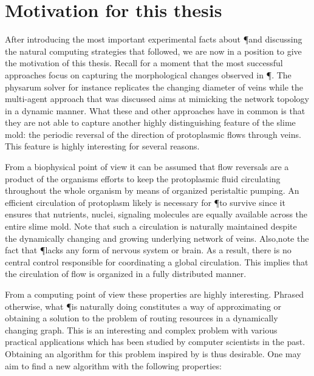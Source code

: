 \section{Motivation for this thesis}

	After introducing the most important experimental facts about \P and discussing the natural computing strategies that followed, we are now in a position to give the motivation of this thesis. Recall for a moment that the most successful approaches focus on capturing the morphological changes observed in \P. The physarum solver for instance replicates the changing  diameter of veins while the multi-agent approach that was discussed aims at mimicking the network topology in a dynamic manner. What these and other approaches have in common is that they are not able to capture another highly distinguishing feature of the slime mold: the periodic reversal of the direction of protoplasmic flows through veins. This feature is highly interesting for several reasons. 

	From a biophysical point of view it can be assumed that flow reversals are a product of the organisms efforts to keep the protoplasmic fluid circulating throughout the whole organism by means of organized peristaltic pumping. An efficient circulation of protoplasm likely is necessary for \P to survive since it ensures that nutrients, nuclei, signaling molecules \etc are equally available across the entire slime mold. Note that such a circulation is naturally maintained despite the dynamically changing and growing underlying network of veins. Also,note the fact that \P lacks any form of nervous system or brain. As a result, there is no central control responsible for coordinating a global circulation. This implies that the circulation of flow is organized in a fully distributed manner.

	From a computing point of view these properties are highly interesting. Phrased otherwise, what \P is naturally doing constitutes a way of approximating or obtaining a solution to the problem of routing resources in a dynamically changing graph. This is an interesting and complex problem with various practical applications which has been studied by computer scientists in the past. Obtaining an algorithm for this problem inspired by \Pp is thus desirable. One may aim to find a new algorithm with the following properties:

